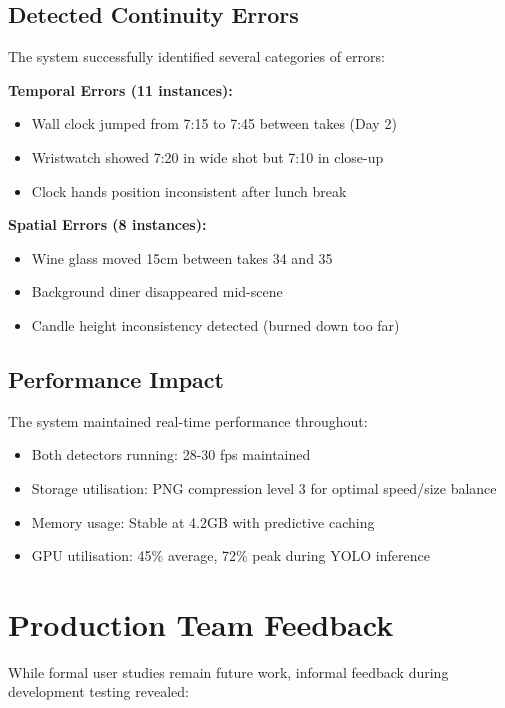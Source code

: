 \subsection{Detected Continuity Errors}
\label{subsec:detected-errors}

The system successfully identified several categories of errors:

\textbf{Temporal Errors (11 instances):}
\begin{itemize}
\item Wall clock jumped from 7:15 to 7:45 between takes (Day 2)
\item Wristwatch showed 7:20 in wide shot but 7:10 in close-up
\item Clock hands position inconsistent after lunch break
\end{itemize}

\textbf{Spatial Errors (8 instances):}
\begin{itemize}
\item Wine glass moved 15cm between takes 34 and 35
\item Background diner disappeared mid-scene
\item Candle height inconsistency detected (burned down too far)
\end{itemize}

\subsection{Performance Impact}
\label{subsec:performance-impact}

The system maintained real-time performance throughout:

\begin{itemize}
\item Both detectors running: 28-30 fps maintained
\item Storage utilisation: PNG compression level 3 for optimal speed/size balance
\item Memory usage: Stable at 4.2GB with predictive caching
\item GPU utilisation: 45\% average, 72\% peak during YOLO inference
\end{itemize}

\section{Production Team Feedback}
\label{sec:feedback}

While formal user studies remain future work, informal feedback during development testing revealed:

